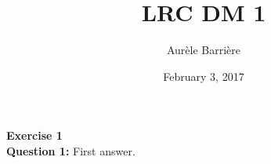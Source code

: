 \documentclass[12pt]{article}
\author{Aur\`ele Barri\`ere}
\title{LRC DM 1}
\date{February 3, 2017}
\def\exercise#1{\Large\textbf{Exercise #1}\normalsize\\}
\def\question#1{\textbf{Question #1:}\quad}
\begin{document}
\maketitle

\exercise{1}
\question{1} First answer.
\end{document}
